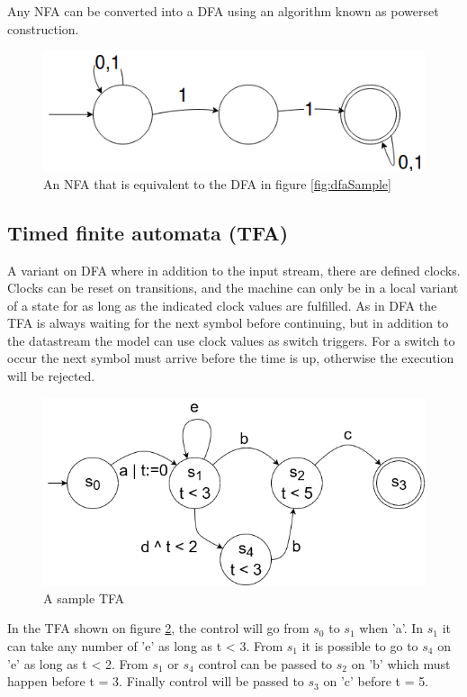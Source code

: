 Any NFA can be converted into a DFA using an algorithm known as powerset construction.

\begin{figure}[H]\label{}
    \centering
    \includegraphics[scale=0.5]{realTimeComputing/fig/NFA.png}
    \caption{An NFA that is equivalent to the DFA in figure \ref{fig:dfaSample}}
    \label{fig:nfaSample}
\end{figure}

\subsection{Timed finite automata (TFA)}
A variant on DFA where in addition to the input stream, there are defined clocks. Clocks can be reset on transitions, and the machine can only be in a local variant of a state for as long as the indicated clock values are fulfilled. As in DFA the TFA is always waiting for the next symbol before continuing, but in addition to the datastream the model can use clock values as switch triggers. For a switch to occur the next symbol must arrive before the time is up, otherwise the execution will be rejected. 

\begin{figure}[H]\label{}
    \centering
    \includegraphics[scale=0.5]{realTimeComputing/fig/TFA.png}
    \caption{A sample TFA}
    \label{fig:tfaSample}
\end{figure}

\noindent In the TFA shown on figure \ref{fig:tfaSample}, the control will go from $s_0$ to $s_1$ when 'a'. In $s_1$ it can take any number of 'e' as long as t < 3. From $s_1$ it is possible to go to $s_4$ on 'e' as long as t < 2. From $s_1$ or $s_4$ control can be passed to $s_2$ on 'b' which must happen before t = 3. Finally control will be passed to $s_3$ on 'c' before t = 5.

